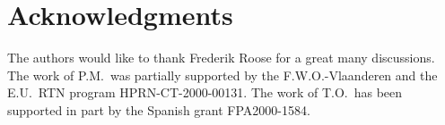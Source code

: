 \documentclass[12pt,a4paper]{article}
\begin{document}
\section*{Acknowledgments}
The authors would like to thank Frederik Roose for a great many
discussions.
The work of P.M.~was partially supported by the F.W.O.-Vlaanderen and
the E.U.~RTN program HPRN-CT-2000-00131.  The work of T.O.~has been
supported in part by the Spanish grant FPA2000-1584.
\end{document}
